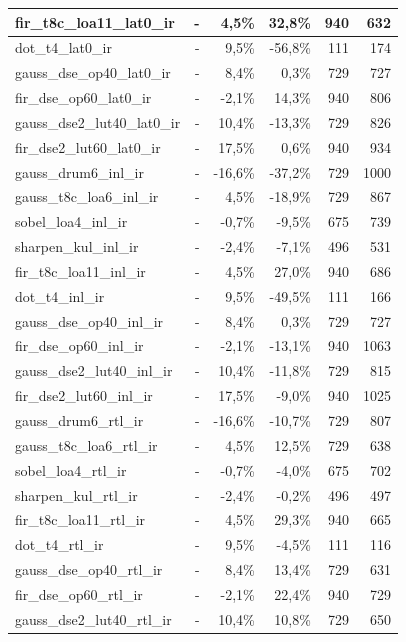\begin{table}[htbp]
\begin{tabular}{|l|r|r|r|r|r|}
fir\_t8c\_loa11\_lat0\_ir & - & 4,5\% & 32,8\% & 940 & 632 \\ \hline
dot\_t4\_lat0\_ir & - & 9,5\% & -56,8\% & 111 & 174 \\ \hline
gauss\_dse\_op40\_lat0\_ir & - & 8,4\% & 0,3\% & 729 & 727 \\ \hline
fir\_dse\_op60\_lat0\_ir & - & -2,1\% & 14,3\% & 940 & 806 \\ \hline
gauss\_dse2\_lut40\_lat0\_ir & - & 10,4\% & -13,3\% & 729 & 826 \\ \hline
fir\_dse2\_lut60\_lat0\_ir & - & 17,5\% & 0,6\% & 940 & 934 \\ \hline
gauss\_drum6\_inl\_ir & - & -16,6\% & -37,2\% & 729 & 1000 \\ \hline
gauss\_t8c\_loa6\_inl\_ir & - & 4,5\% & -18,9\% & 729 & 867 \\ \hline
sobel\_loa4\_inl\_ir & - & -0,7\% & -9,5\% & 675 & 739 \\ \hline
sharpen\_kul\_inl\_ir & - & -2,4\% & -7,1\% & 496 & 531 \\ \hline
fir\_t8c\_loa11\_inl\_ir & - & 4,5\% & 27,0\% & 940 & 686 \\ \hline
dot\_t4\_inl\_ir & - & 9,5\% & -49,5\% & 111 & 166 \\ \hline
gauss\_dse\_op40\_inl\_ir & - & 8,4\% & 0,3\% & 729 & 727 \\ \hline
fir\_dse\_op60\_inl\_ir & - & -2,1\% & -13,1\% & 940 & 1063 \\ \hline
gauss\_dse2\_lut40\_inl\_ir & - & 10,4\% & -11,8\% & 729 & 815 \\ \hline
fir\_dse2\_lut60\_inl\_ir & - & 17,5\% & -9,0\% & 940 & 1025 \\ \hline
gauss\_drum6\_rtl\_ir & - & -16,6\% & -10,7\% & 729 & 807 \\ \hline
gauss\_t8c\_loa6\_rtl\_ir & - & 4,5\% & 12,5\% & 729 & 638 \\ \hline
sobel\_loa4\_rtl\_ir & - & -0,7\% & -4,0\% & 675 & 702 \\ \hline
sharpen\_kul\_rtl\_ir & - & -2,4\% & -0,2\% & 496 & 497 \\ \hline
fir\_t8c\_loa11\_rtl\_ir & - & 4,5\% & 29,3\% & 940 & 665 \\ \hline
dot\_t4\_rtl\_ir & - & 9,5\% & -4,5\% & 111 & 116 \\ \hline
gauss\_dse\_op40\_rtl\_ir & - & 8,4\% & 13,4\% & 729 & 631 \\ \hline
fir\_dse\_op60\_rtl\_ir & - & -2,1\% & 22,4\% & 940 & 729 \\ \hline
gauss\_dse2\_lut40\_rtl\_ir & - & 10,4\% & 10,8\% & 729 & 650 \\ \hline

\end{tabular}
\end{table}
